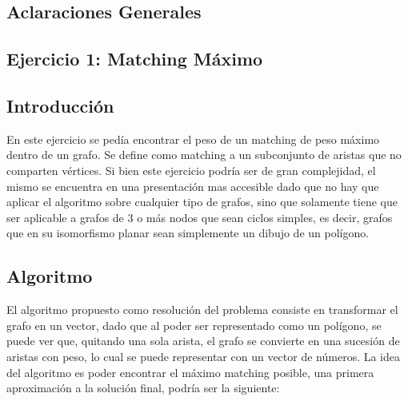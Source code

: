 \documentclass[a4paper, 12pt]{article}
\begin{document}
\tableofcontents

\newpage


\begin{center}
\section*{Aclaraciones Generales}
\end{center}

\newpage
\begin{center}
\section*{Ejercicio 1: Matching Máximo}
\end{center}
 
\subsection*{Introducción}
En este ejercicio se pedía encontrar el peso de un matching de peso máximo dentro de un grafo. Se define como matching a un subconjunto de aristas que no comparten vértices. Si bien este ejercicio podría ser de gran complejidad, el mismo se encuentra en una presentación mas accesible dado que no hay que aplicar el algoritmo sobre cualquier tipo de grafos, sino que solamente tiene que ser aplicable a grafos de 3 o más nodos que sean ciclos simples, es decir, grafos que en su isomorfismo planar sean simplemente un dibujo de un polígono.


\subsection*{Algoritmo}



El algoritmo propuesto como resolución del problema consiste en transformar el grafo en un vector, dado que al poder ser representado como un polígono, se puede ver que, quitando una sola arista, el grafo se convierte en una sucesión de aristas con peso, lo cual se puede representar con un vector de números. La idea del algoritmo es poder encontrar el máximo matching posible, una primera aproximación a la solución final, podría ser la siguiente:
\end{document}
